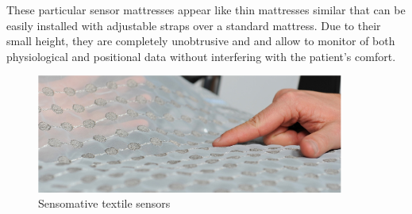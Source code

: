 These particular sensor mattresses appear like thin mattresses similar that can be easily installed with adjustable straps over a standard mattress. 
Due to their small height, they are completely unobtrusive and and allow to monitor of both physiological and positional data without interfering with the patient's comfort.


\begin{figure}[h]
    \centering
     \includegraphics[width=0.9\textwidth]{img/sensomative.pdf}
     \caption{Sensomative textile sensors}
     \label{fig:sensomativeSensors}
 \end{figure}


